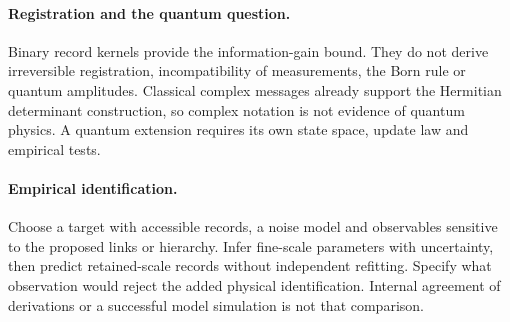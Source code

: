 \paragraph{Registration and the quantum question.}
Binary record kernels provide the information-gain bound. They do not derive irreversible registration, incompatibility of measurements, the Born rule or quantum amplitudes. Classical complex messages already support the Hermitian determinant construction, so complex notation is not evidence of quantum physics. A quantum extension requires its own state space, update law and empirical tests.

\paragraph{Empirical identification.}
Choose a target with accessible records, a noise model and observables sensitive to the proposed links or hierarchy. Infer fine-scale parameters with uncertainty, then predict retained-scale records without independent refitting. Specify what observation would reject the added physical identification. Internal agreement of derivations or a successful model simulation is not that comparison.

